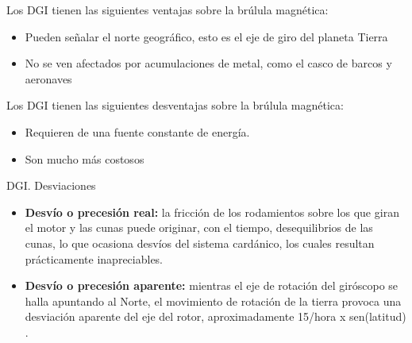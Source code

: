 




\begin{frame}
  \begin{exampleblock}
    {Los DGI tienen las siguientes ventajas sobre la br\'ulula
    magn\'etica:}
	{
    \begin{itemize}
    \item Pueden se\~nalar el norte geogr\'afico, esto es el eje de
      giro del planeta Tierra
    \item No se ven afectados por acumulaciones de metal, como el
      casco de barcos y aeronaves
    \end{itemize}
	}
  \end{exampleblock}

  \begin{alertblock}{Los DGI tienen las siguientes desventajas sobre la br\'ulula
    magn\'etica:}
    {
      \begin{itemize}
      \item     Requieren de una fuente constante de energ\'ia.
      \item Son mucho m\'as costosos
      \end{itemize}
	}
  \end{alertblock}

\end{frame}

\begin{frame}{DGI. Desviaciones}

  \begin{itemize}
  	\item {\bf Desv\'io o precesi\'on real:} la fricci\'on de los rodamientos sobre los
que giran el motor y las cunas puede originar, con el tiempo,
desequilibrios de las cunas, lo que ocasiona desv\'ios del sistema
card\'anico, los cuales resultan pr\'acticamente inapreciables.

	\item {\bf Desv\'io o precesi\'on aparente:} mientras el eje de rotaci\'on del
gir\'oscopo se halla apuntando al Norte, el movimiento de rotaci\'on de
la tierra provoca una desviaci\'on aparente del eje del rotor,
aproximadamente 15\grad/hora x sen(latitud) .
  \end{itemize}

\end{frame}


